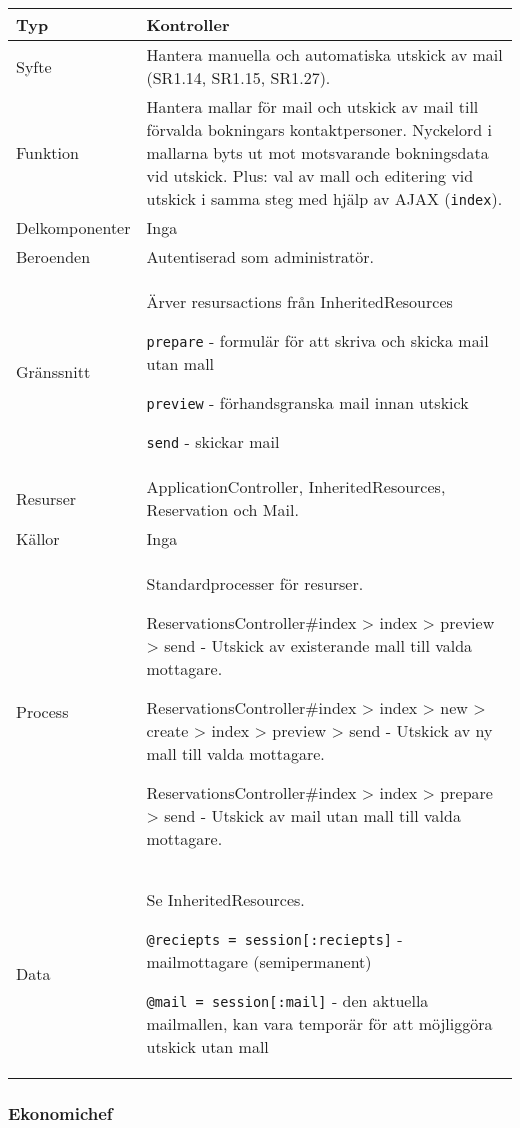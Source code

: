 \documentclass[a4paper, twoside, 11pt, titlepage]{article}
\begin{document}
			\begin {table} [ht] \begin{tabular} {  p{3.5cm} p{9.6cm} }
				\hline
				{Typ} & {Kontroller} \\
				\hline
				{Syfte} & {Hantera manuella och automatiska utskick av mail (SR1.14, SR1.15, SR1.27).} \\
				\hline
				{Funktion} & {Hantera mallar för mail och utskick av mail till förvalda bokningars kontaktpersoner. Nyckelord i mallarna byts ut mot motsvarande bokningsdata vid utskick. Plus: val av mall och editering vid utskick i samma steg med hjälp av AJAX ({\tt index}).} \\
				\hline
				{Delkomponenter} & {Inga} \\
				\hline
				{Beroenden} & {Autentiserad som administratör.} \\
				\hline
				{Gränssnitt} & {Ärver resursactions från InheritedResources

{\tt prepare} - formulär för att skriva och skicka mail utan mall

{\tt preview} - förhandsgranska mail innan utskick

{\tt send} - skickar mail} \\
				\hline
				{Resurser} & {ApplicationController, InheritedResources, Reservation och Mail.} \\
				\hline
				{Källor} & {Inga} \\
				\hline
				{Process} & {Standardprocesser för resurser.

ReservationsController\#index > index > preview > send - Utskick av existerande mall till valda mottagare.

ReservationsController\#index > index > new > create > index > preview > send - Utskick av ny mall till valda mottagare.

ReservationsController\#index > index > prepare > send - Utskick av mail utan mall till valda mottagare.} \\
				\hline
				{Data} & {Se InheritedResources.

{\tt @reciepts = session[:reciepts]} - mailmottagare (semipermanent)

{\tt @mail = session[:mail]} - den aktuella mailmallen, kan vara temporär för att möjliggöra utskick utan mall} \\
				\hline
			\end{tabular} \end{table} \FloatBarrier


		\subsubsection{Ekonomichef}
\end{document}
